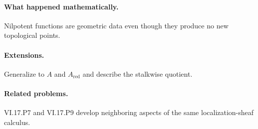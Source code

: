 \paragraph{What happened mathematically.}
Nilpotent functions are geometric data even though they produce no new topological points.

\paragraph{Extensions.}
Generalize to $A$ and $A_{\mathrm{red}}$ and describe the stalkwise quotient.

\paragraph{Related problems.}
VI.17.P7 and VI.17.P9 develop neighboring aspects of the same localization-sheaf calculus.
\fi

